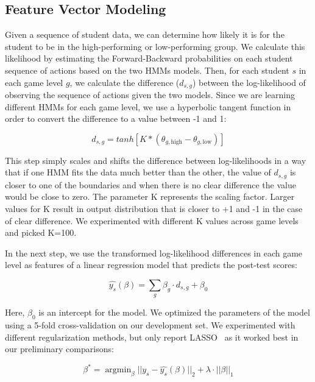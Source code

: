 \documentclass{sigchi}
\DeclareMathOperator*{\argmin}{argmin}
\begin{document}
	\subsection{Feature Vector Modeling}

	Given a sequence of student data, we can determine how likely it is for the student to be in the high-performing or low-performing group.
	We calculate this likelihood by estimating the Forward-Backward probabilities  on each student sequence of actions  based on the two HMMs models.
	Then, for each student $s$ in each game level $g$, we calculate the difference ($d_{s,g}$) between the log-likelihood of observing the sequence of actions given the two models. 
	Since we are learning different HMMs for each game level,
	we use a hyperbolic tangent function in order to convert the difference to a value between -1 and 1: 
	
	\begin{equation}
	d_{s,g} = tanh[ K * (\theta_{g, \text{high}} - \theta_{g, \text{low}})]
	\end{equation}
	
	This step simply scales and shifts the difference between  log-likelihoods in a way that if one HMM fits the
	data much better than the other, the value of $d_{s,g}$ is closer to one of the boundaries and when there is no clear difference the value would be close to zero. 
	The parameter K represents the scaling factor.
	Larger values for K result in output distribution that is closer to +1 and -1 in the case of clear difference.
	We experimented with different K values across game levels and picked K=100.


	In the next step, we use the transformed log-likelihood differences in each game level as features of a linear regression model that predicts the post-test scores:

	\begin{equation}
	\hat {y_s}(\beta) =   \sum_g \beta_g \cdot d_{s,g}  + \beta_0
	\end{equation}
	
	Here, $\beta_0$ is an intercept for the  model.  
	We optimized the parameters of the model using a 5-fold cross-validation on our development set.
	We experimented with different regularization methods, but only report LASSO~\cite{tibshirani1996regression} as it worked best in our preliminary comparisons:

	\begin{equation}
	\beta^* = \argmin_\beta || y_s - \hat{y_s}(\beta)  ||_2 + \lambda \cdot || \beta ||_1
	\end{equation}
	
\end{document}
